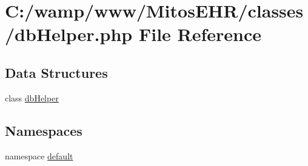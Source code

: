 \hypertarget{db_helper_8php}{\section{\-C\-:/wamp/www/\-Mitos\-E\-H\-R/classes/db\-Helper.php \-File \-Reference}
\label{db_helper_8php}
}
\subsection*{\-Data \-Structures}
\begin{DoxyCompactItemize}
\item 
class \hyperlink{classdb_helper}{db\-Helper}
\end{DoxyCompactItemize}
\subsection*{\-Namespaces}
\begin{DoxyCompactItemize}
\item 
namespace \hyperlink{namespacedefault}{default}
\end{DoxyCompactItemize}
